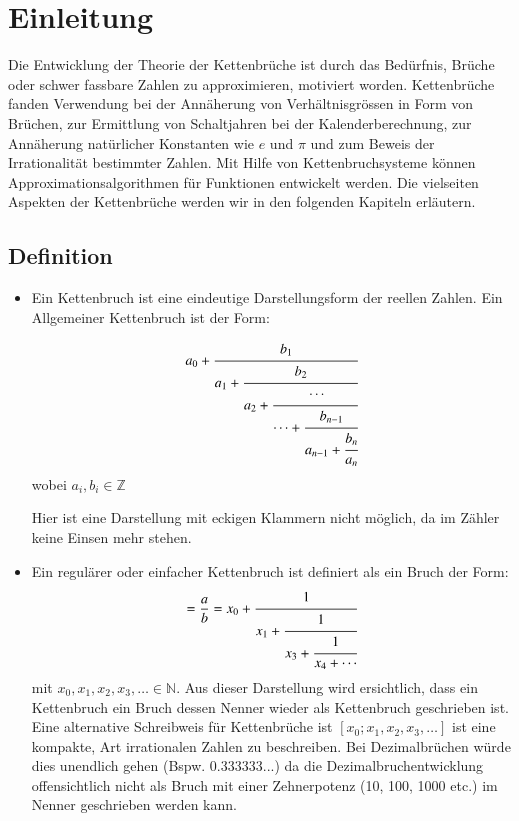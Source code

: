 %
%
%
\section{Einleitung\label{kettenbruch:section:einleitung}}
Die Entwicklung der Theorie der Kettenbrüche ist durch das Bedürfnis,
Brüche oder schwer fassbare Zahlen zu approximieren, motiviert
worden. Kettenbrüche fanden Verwendung bei der Annäherung von
Verhältnisgrössen in Form von Brüchen, zur Ermittlung von Schaltjahren
bei der Kalenderberechnung, zur Annäherung natürlicher Konstanten
wie $e$ und $\pi$ und zum Beweis der Irrationalität bestimmter
Zahlen. Mit Hilfe von Kettenbruchsysteme können Approximationsalgorithmen 
für Funktionen entwickelt werden. Die vielseiten Aspekten der Kettenbrüche
werden wir in den folgenden Kapiteln erläutern.

\subsection{Definition\label{kettenbruch:section:1s}}
\begin{itemize}
\item
Ein Kettenbruch ist eine eindeutige Darstellungsform der reellen Zahlen. 
Ein Allgemeiner Kettenbruch ist der Form:
\begin{beispiel}
\begin{equation}
a_0 + \cfrac{b_1}{a_1+\cfrac{b_2}{a_2+\cfrac{\cdots}{\cdots+\cfrac{b_{n-1}}{a_{n-1} + \cfrac{b_n}{a_n}}}}}
\end{equation}
wobei $a_i, b_i \in \mathbb{Z}$
\end{beispiel}
Hier ist eine Darstellung mit eckigen Klammern nicht möglich, da im Zähler keine Einsen mehr stehen.
\item
Ein regulärer oder einfacher Kettenbruch ist definiert als ein Bruch der Form:
\begin{align*}
[x_0;x_1,x_2,\cdots,x_n]
=
\frac{a}{b}=x_0+\cfrac{1}{x_1+\cfrac{1}{x_3+\cfrac{1}{x_4+\cdots}}}
\end{align*}
mit $x_0,x_1,x_2,x_3, \dots \in \mathbb{N}$.
Aus dieser Darstellung wird ersichtlich, dass ein Kettenbruch ein Bruch dessen 
Nenner wieder als Kettenbruch geschrieben ist.
Eine alternative Schreibweis für Kettenbrüche ist $[x_0;x_1,x_2,x_3,\dots]$ 
ist eine kompakte, Art irrationalen Zahlen  zu beschreiben. 
Bei Dezimalbrüchen würde dies unendlich gehen (Bspw. 0.333333...) da die Dezimalbruchentwicklung offensichtlich nicht als Bruch mit einer Zehnerpotenz (10, 100, 1000 etc.) im Nenner  geschrieben werden kann.
\end{itemize}

